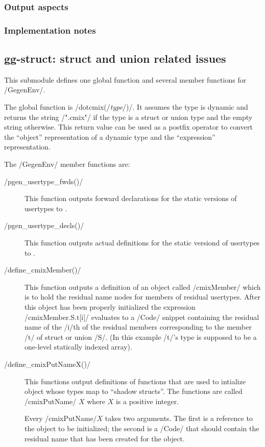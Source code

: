 \begin{docpart}
\subsubsection{Output aspects}

\subsubsection{Implementation notes}

\subsection{gg-struct: struct and union related issues}

This submodule defines one global function and several member
functions for /GegenEnv/.

The global function is /dotcmix(/\textit{type}/)/. It assumes the
type is dynamic and returns the string /".cmix"/ if the type is
a struct or union type and the empty string otherwise. This return
value can be used as a postfix operator to convert the ``object''
representation of a dynamic type and the ``expression'' representation.

The /GegenEnv/ member functions are:
\begin{description}
\item[/pgen_usertype_fwds()/]
	This function outputs forward declarations for the static
	versions of usertypes to \Pgen.
\item[/pgen_usertype_decls()/]
	This function outputs actual definitions for the static
	versiond of usertypes to \Pgen.
\item[/define_cmixMember()/]
	This function outputs a definition of an object called
	/cmixMember/ which is to hold the residual name nodes for
	members of residual usertypes. After this object has
	been properly initialized the expression /cmixMember.S.t[i]/
	evaluates to a /Code/ snippet containing the residual name
	of the /i/th of the residual members corresponding to the
	member /t/ of struct or union /S/. (In this example /t/'s
	type is supposed to be a one-level statically indexed array).
\item[/define_cmixPutNameX()/]
	This functions output definitions of functions that are
	used to intialize \Pgen object whose types map to
	``shadow structs''. The functions are called /cmixPutName/
	$X$ where $X$ is a positive integer.

	Every /cmixPutName/$X$ takes two arguments. The first is
	a reference to the \Pgen object to be initialized; the second
	is a /Code/ that should contain the residual name that has
	been created for the object.


\end{description}
\end{docpart}
